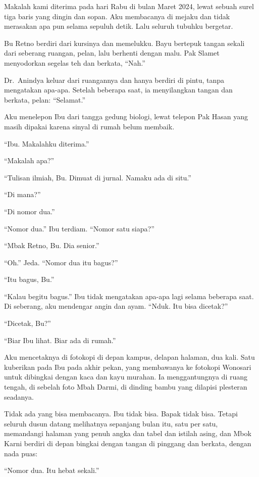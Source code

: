 \documentclass[11pt,twoside,openany]{book}
\makeatletter
\newcommand{\scenebreak}{\par\vspace{0.9em}{\centering\textsc{*\hspace{0.7em}*\hspace{0.7em}*}\par}\vspace{0.9em}\@afterindentfalse\@afterheading}
\makeatother
\begin{document}
\scenebreak
Makalah kami diterima pada hari Rabu di bulan Maret 2024, lewat sebuah surel tiga baris yang dingin dan sopan. Aku membacanya di mejaku dan tidak merasakan apa pun selama sepuluh detik. Lalu seluruh tubuhku bergetar.

Bu Retno berdiri dari kursinya dan memelukku. Bayu bertepuk tangan sekali dari seberang ruangan, pelan, lalu berhenti dengan malu. Pak Slamet menyodorkan segelas teh dan berkata, ``Nah.''

Dr.~Anindya keluar dari ruangannya dan hanya berdiri di pintu, tanpa mengatakan apa-apa. Setelah beberapa saat, ia menyilangkan tangan dan berkata, pelan: ``Selamat.''

Aku menelepon Ibu dari tangga gedung biologi, lewat telepon Pak Hasan yang masih dipakai karena sinyal di rumah belum membaik.

``Ibu. Makalahku diterima.''

``Makalah apa?''

``Tulisan ilmiah, Bu. Dimuat di jurnal. Namaku ada di situ.''

``Di mana?''

``Di nomor dua.''

``Nomor dua.'' Ibu terdiam. ``Nomor satu siapa?''

``Mbak Retno, Bu. Dia senior.''

``Oh.'' Jeda. ``Nomor dua itu bagus?''

``Itu bagus, Bu.''

``Kalau begitu bagus.'' Ibu tidak mengatakan apa-apa lagi selama beberapa saat. Di seberang, aku mendengar angin dan ayam. ``Nduk. Itu bisa dicetak?''

``Dicetak, Bu?''

``Biar Ibu lihat. Biar ada di rumah.''

Aku mencetaknya di fotokopi di depan kampus, delapan halaman, dua kali. Satu kuberikan pada Ibu pada akhir pekan, yang membawanya ke fotokopi Wonosari untuk dibingkai dengan kaca dan kayu murahan. Ia menggantungnya di ruang tengah, di sebelah foto Mbah Darmi, di dinding bambu yang dilapisi plesteran seadanya.

Tidak ada yang bisa membacanya. Ibu tidak bisa. Bapak tidak bisa. Tetapi seluruh dusun datang melihatnya sepanjang bulan itu, satu per satu, memandangi halaman yang penuh angka dan tabel dan istilah asing, dan Mbok Karni berdiri di depan bingkai dengan tangan di pinggang dan berkata, dengan nada puas:

``Nomor dua. Itu hebat sekali.''
\end{document}
